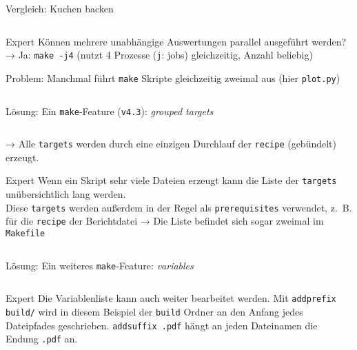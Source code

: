 
\begin{frame}[fragile]{Vergleich: Kuchen backen}
  \begin{center}
    \inputminted{make}{example-files/Cake}
  \end{center}
\end{frame}


\begin{frame}[fragile]{Expert}
  Können mehrere unabhängige Auswertungen parallel ausgeführt werden? \\
  → Ja: \;\texttt{make -j4}\; (nutzt 4 Prozesse (\texttt{j}: jobs) gleichzeitig, Anzahl beliebig)

  Problem: Manchmal führt \texttt{make} Skripte gleichzeitig zweimal aus (hier \texttt{plot.py})
  \begin{center}
    \small
    \inputminted{make}{example-files/Advanced-0}
  \end{center}

  Lösung: Ein \texttt{make}-Feature (\texttt{v4.3}): \emph{grouped targets}
  \begin{center}
    \small
    \inputminted{make}{example-files/Advanced-1}
  \end{center}
   → Alle \texttt{targets} werden durch eine einzigen Durchlauf der \texttt{recipe} (gebündelt) erzeugt.
\end{frame}

\begin{frame}[fragile]{Expert}
  Wenn ein Skript sehr viele Dateien erzeugt kann die Liste der \texttt{targets} unübersichtlich lang werden.\\
  Diese \texttt{targets} werden außerdem in der Regel als \texttt{prerequisites} verwendet,
  z.~B. für die \texttt{recipe} der Berichtdatei  → Die Liste befindet sich sogar zweimal im \texttt{Makefile}

  \begin{center}
    \small
    \inputminted{make}{example-files/Advanced-2}
  \end{center}
  Lösung: Ein weiteres \texttt{make}-Feature: \emph{variables}
  \begin{center}
    \small
    \inputminted{make}{example-files/Advanced-3}
  \end{center}
\end{frame}

\begin{frame}[fragile]{Expert}
  Die Variablenliste kann auch weiter bearbeitet werden.
  Mit \texttt{addprefix build/} wird in diesem Beispiel der \texttt{build} Ordner
  an den Anfang jedes Dateipfades geschrieben.
  \texttt{addsuffix .pdf} hängt an jeden Dateinamen die Endung \texttt{.pdf} an.
  \begin{center}
    \small
    \inputminted{make}{example-files/Advanced-4}
  \end{center}
\end{frame}
